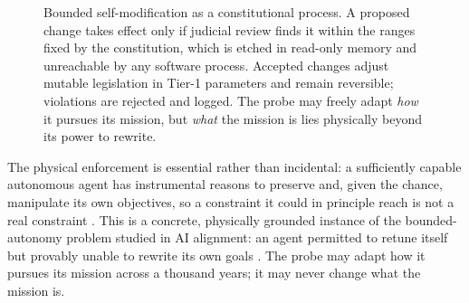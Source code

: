 \documentclass[10pt, a4paper]{article}
\begin{document}
\begin{figure}[ht]
\centering
{}
\caption{Bounded self-modification as a constitutional process. A proposed change takes effect only if judicial review finds it within the ranges fixed by the constitution, which is etched in read-only memory and unreachable by any software process. Accepted changes adjust mutable legislation in Tier-1 parameters and remain reversible; violations are rejected and logged. The probe may freely adapt \textit{how} it pursues its mission, but \textit{what} the mission is lies physically beyond its power to rewrite.}
\label{fig:constitution}
\end{figure}

The physical enforcement is essential rather than incidental: a sufficiently capable autonomous agent has instrumental reasons to preserve and, given the chance, manipulate its own objectives, so a constraint it could in principle reach is not a real constraint \cite{omohundro2008}. This is a concrete, physically grounded instance of the bounded-autonomy problem studied in AI alignment: an agent permitted to retune itself but provably unable to rewrite its own goals \cite{bai2022, soares2015, russell2019}. The probe may adapt how it pursues its mission across a thousand years; it may never change what the mission is.
\end{document}
